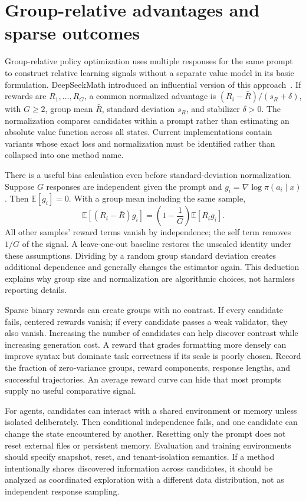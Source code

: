 \section{Group-relative advantages and sparse outcomes}
\label{sec:C08:grpo}
Group-relative policy optimization uses multiple responses for the same prompt to construct relative learning signals without a separate value model in its basic formulation. DeepSeekMath introduced an influential version of this approach~\cite{rewrite_grpo}. If rewards are $R_1,\ldots,R_G$, a common normalized advantage is $(R_i-\bar R)/(s_R+\delta)$, with $G\geq2$, group mean $\bar R$, standard deviation $s_R$, and stabilizer $\delta>0$. The normalization compares candidates within a prompt rather than estimating an absolute value function across all states. Current implementations contain variants whose exact loss and normalization must be identified rather than collapsed into one method name.

There is a useful bias calculation even before standard-deviation normalization. Suppose $G$ responses are independent given the prompt and $g_i=\nabla\log\pi(a_i\mid x)$. Then $\mathbb E[g_i]=0$. With a group mean including the same sample,
\begin{equation}
 \mathbb E[(R_i-\bar R)g_i]
 =\left(1-\frac1G\right)\mathbb E[R_i g_i].
\end{equation}
All other samples' reward terms vanish by independence; the self term removes $1/G$ of the signal. A leave-one-out baseline restores the unscaled identity under these assumptions. Dividing by a random group standard deviation creates additional dependence and generally changes the estimator again. This deduction explains why group size and normalization are algorithmic choices, not harmless reporting details.

Sparse binary rewards can create groups with no contrast. If every candidate fails, centered rewards vanish; if every candidate passes a weak validator, they also vanish. Increasing the number of candidates can help discover contrast while increasing generation cost. A reward that grades formatting more densely can improve syntax but dominate task correctness if its scale is poorly chosen. Record the fraction of zero-variance groups, reward components, response lengths, and successful trajectories. An average reward curve can hide that most prompts supply no useful comparative signal.

For agents, candidates can interact with a shared environment or memory unless isolated deliberately. Then conditional independence fails, and one candidate can change the state encountered by another. Resetting only the prompt does not reset external files or persistent memory. Evaluation and training environments should specify snapshot, reset, and tenant-isolation semantics. If a method intentionally shares discovered information across candidates, it should be analyzed as coordinated exploration with a different data distribution, not as independent response sampling.

